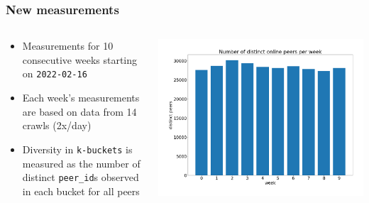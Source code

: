 \documentclass{pl-slide}
\begin{document}
\begin{frame}
\frametitle{New measurements}
\begin{columns}[onlytextwidth]
\begin{column}{0.38\textwidth}
   \begin{itemize}
   		\item Measurements for 10 consecutive weeks starting on \texttt{2022-02-16}
   		\item Each week's measurements are based on data from 14 crawls (2x/day)
   		\item Diversity in \texttt{k-buckets} is measured as the number of distinct \texttt{peer\_id}s observed in each bucket for all peers
   \end{itemize}
\end{column}
\begin{column}{0.58\textwidth}
    \begin{center}
		\includegraphics[width=\textwidth]{plots/online-peers-per-week.png}
    \end{center}
\end{column}
\end{columns}
\end{frame}
\end{document}
